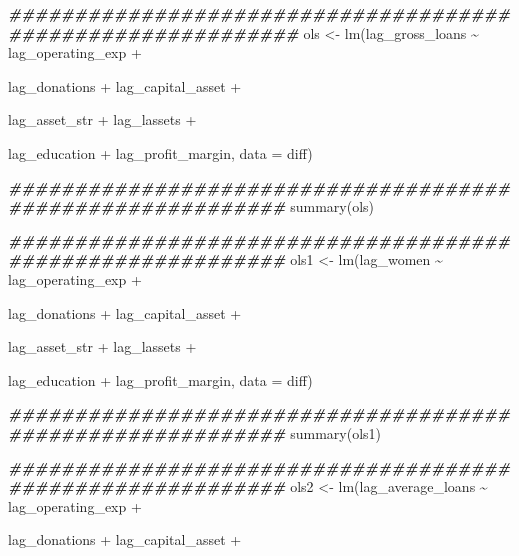 \documentclass[a4paper,nobind]{templates/ociamthesis}
\newenvironment{Shaded}{\begin{snugshade}}{\end{snugshade}}
\newcommand{\AttributeTok}[1]{\textcolor[rgb]{0.77,0.63,0.00}{#1}}
\newcommand{\DocumentationTok}[1]{\textcolor[rgb]{0.56,0.35,0.01}{\textbf{\textit{#1}}}}
\newcommand{\FunctionTok}[1]{\textcolor[rgb]{0.00,0.00,0.00}{#1}}
\newcommand{\NormalTok}[1]{#1}
\newcommand{\OtherTok}[1]{\textcolor[rgb]{0.56,0.35,0.01}{#1}}
\newcommand{\SpecialCharTok}[1]{\textcolor[rgb]{0.00,0.00,0.00}{#1}}
\renewenvironment{Shaded}
{
  \vspace{10pt}%
  \begin{snugshade}%
}{%
  \end{snugshade}%
  \vspace{8pt}%
}
\begin{document}
\begin{Shaded}
\begin{Highlighting}[]
\DocumentationTok{\#\#\#\#\#\#\#\#\#\#\#\#\#\#\#\#\#\#\#\#\#\#\#\#\#\#\#\#\#\#\#\#\#\#\#\#\#\#\#\#\#\#\#\#\#\#\#\#\#\#\#\#\#\#\#\#\#\#\#\#}
\NormalTok{ols }\OtherTok{\textless{}{-}} \FunctionTok{lm}\NormalTok{(lag\_gross\_loans }\SpecialCharTok{\textasciitilde{}}\NormalTok{ lag\_operating\_exp }\SpecialCharTok{+} 
            
\NormalTok{            lag\_donations }\SpecialCharTok{+}\NormalTok{ lag\_capital\_asset }\SpecialCharTok{+} 
            
\NormalTok{            lag\_asset\_str }\SpecialCharTok{+}\NormalTok{ lag\_lassets }\SpecialCharTok{+} 
            
\NormalTok{            lag\_education }\SpecialCharTok{+}\NormalTok{ lag\_profit\_margin, }\AttributeTok{data =}\NormalTok{ diff)}

\DocumentationTok{\#\#\#\#\#\#\#\#\#\#\#\#\#\#\#\#\#\#\#\#\#\#\#\#\#\#\#\#\#\#\#\#\#\#\#\#\#\#\#\#\#\#\#\#\#\#\#\#\#\#\#\#\#\#\#\#\#\#\#}
\FunctionTok{summary}\NormalTok{(ols)}

\DocumentationTok{\#\#\#\#\#\#\#\#\#\#\#\#\#\#\#\#\#\#\#\#\#\#\#\#\#\#\#\#\#\#\#\#\#\#\#\#\#\#\#\#\#\#\#\#\#\#\#\#\#\#\#\#\#\#\#\#\#\#\#}
\NormalTok{ols1 }\OtherTok{\textless{}{-}} \FunctionTok{lm}\NormalTok{(lag\_women }\SpecialCharTok{\textasciitilde{}}\NormalTok{ lag\_operating\_exp }\SpecialCharTok{+} 
            
\NormalTok{            lag\_donations }\SpecialCharTok{+}\NormalTok{ lag\_capital\_asset }\SpecialCharTok{+} 
            
\NormalTok{            lag\_asset\_str }\SpecialCharTok{+}\NormalTok{ lag\_lassets }\SpecialCharTok{+} 
            
\NormalTok{            lag\_education }\SpecialCharTok{+}\NormalTok{ lag\_profit\_margin, }\AttributeTok{data =}\NormalTok{ diff)}

\DocumentationTok{\#\#\#\#\#\#\#\#\#\#\#\#\#\#\#\#\#\#\#\#\#\#\#\#\#\#\#\#\#\#\#\#\#\#\#\#\#\#\#\#\#\#\#\#\#\#\#\#\#\#\#\#\#\#\#\#\#\#\#}
\FunctionTok{summary}\NormalTok{(ols1)}

\DocumentationTok{\#\#\#\#\#\#\#\#\#\#\#\#\#\#\#\#\#\#\#\#\#\#\#\#\#\#\#\#\#\#\#\#\#\#\#\#\#\#\#\#\#\#\#\#\#\#\#\#\#\#\#\#\#\#\#\#\#\#\#}
\NormalTok{ols2 }\OtherTok{\textless{}{-}} \FunctionTok{lm}\NormalTok{(lag\_average\_loans }\SpecialCharTok{\textasciitilde{}}\NormalTok{ lag\_operating\_exp }\SpecialCharTok{+} 
            
\NormalTok{            lag\_donations }\SpecialCharTok{+}\NormalTok{ lag\_capital\_asset }\SpecialCharTok{+} 
            

\end{Highlighting}
\end{Shaded}
\end{document}
